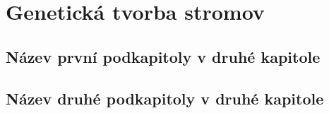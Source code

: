 \chapter{Genetická tvorba stromov}

\section{Název první podkapitoly v druhé kapitole}

\section{Název druhé podkapitoly v druhé kapitole}
